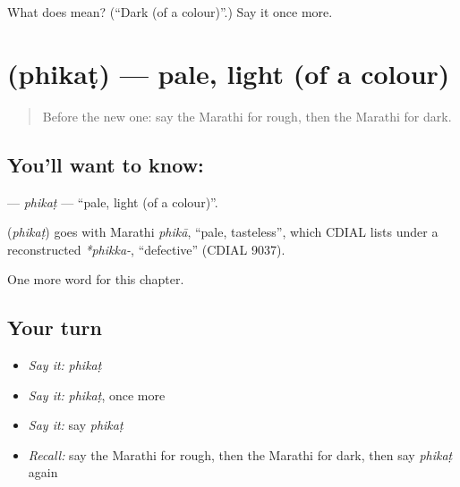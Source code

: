 \begin{tcolorbox}[breakable,colback=teal!4,colframe=teal!35!black,title={Before you move on}]
What does  mean? (\textquotedblleft{}Dark (of a colour)\textquotedblright{}.) Say it once more.
\end{tcolorbox}
\section[\texorpdfstring{\mr{फिकट} (phikaṭ)}{फिकट (phikaṭ)}]{ (phikaṭ) — pale, light (of a colour)}

\label{lesson:MR-C233-phikat}



\begin{quote}
Before the new one: say the Marathi for rough, then the Marathi for dark.
\end{quote}

\subsection*{You'll want to know: }
\textbf{} — \emph{phikaṭ} — \textquotedblleft{}pale, light (of a colour)\textquotedblright{}.

\begin{cousinweb}
\textbf{} (\emph{phikaṭ}) goes with Marathi \emph{phikā}, \textquotedblleft{}pale, tasteless\textquotedblright{}, which CDIAL lists under a reconstructed \emph{*phikka-}, \textquotedblleft{}defective\textquotedblright{} (CDIAL 9037).
\end{cousinweb}

\begin{grammarlens}[title={What you've built}]
One more word for this chapter.
\end{grammarlens}

\subsection*{Your turn}
\begin{itemize}
\raggedright
  \item \emph{Say it:} \emph{phikaṭ}
  \item \emph{Say it:} \emph{phikaṭ}, once more
  \item \emph{Say it:} say \emph{phikaṭ}
  \item \emph{Recall:} say the Marathi for rough, then the Marathi for dark, then say \emph{phikaṭ} again
\end{itemize}


